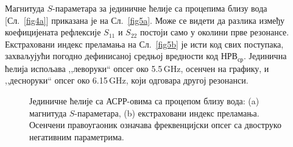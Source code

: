 Магнитуда $S$-параметара за јединичне ћелије са процепима близу вода [Сл.~\ref{fig4a}] приказана је на Сл.~\ref{fig5a}. Може се видети да разлика између коефицијената рефлексије $S_{11}$ и $S_{22}$ постоји само у околини прве резонансе. Екстраховани индекс преламања на Сл.~\ref{fig5b} је исти код свих поступака, захваљујући погодно дефинисаној средњој вредности код $НРВ_{ср}$. Јединична ћелија испољава ,,леворуки`` опсег око 5.5\,GHz, осенчен на графику, и ,,десноруки`` опсег око 6.15\,GHz, који одговара другој резонанси.
\begin{figure}[!t]
\caption{Јединичне ћелије са АСРР-овима са процепом близу вода: (a) магнитуда $S$-параметара, (b) екстраховани индекс преламања. Осенчени правоугаоник означава фреквенцијски опсег са двоструко негативним параметрима.}
\label{fig5}
\end{figure} 

